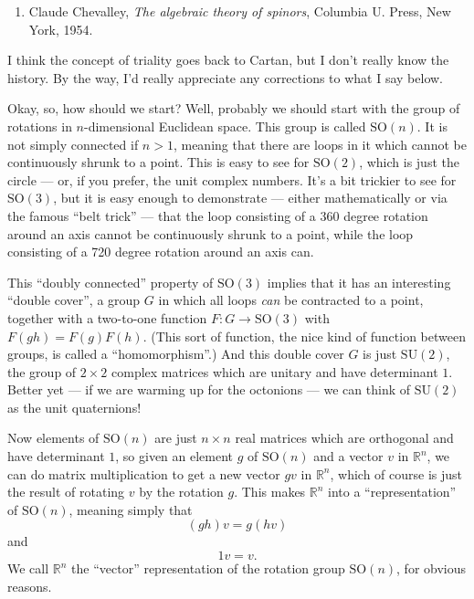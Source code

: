 \documentclass{article}
\def\tightlist{}
\begin{document}
\begin{enumerate}
\def\labelenumi{\arabic{enumi})}
\setcounter{enumi}{1}
\tightlist
\item
  Claude Chevalley, \emph{The algebraic theory of spinors}, Columbia U.
  Press, New York, 1954.
\end{enumerate}

I think the concept of triality goes back to Cartan, but I don't really
know the history. By the way, I'd really appreciate any corrections to
what I say below.

Okay, so, how should we start? Well, probably we should start with the
group of rotations in \(n\)-dimensional Euclidean space. This group is
called \(\mathrm{SO}(n)\). It is not simply connected if \(n > 1\),
meaning that there are loops in it which cannot be continuously shrunk
to a point. This is easy to see for \(\mathrm{SO}(2)\), which is just
the circle --- or, if you prefer, the unit complex numbers. It's a bit
trickier to see for \(\mathrm{SO}(3)\), but it is easy enough to
demonstrate --- either mathematically or via the famous ``belt trick''
--- that the loop consisting of a 360 degree rotation around an axis
cannot be continuously shrunk to a point, while the loop consisting of a
720 degree rotation around an axis can.

This ``doubly connected'' property of \(\mathrm{SO}(3)\) implies that it
has an interesting ``double cover'', a group \(G\) in which all loops
\emph{can} be contracted to a point, together with a two-to-one function
\(F\colon G \to \mathrm{SO}(3)\) with \(F(gh) = F(g)F(h)\). (This sort
of function, the nice kind of function between groups, is called a
``homomorphism''.) And this double cover \(G\) is just
\(\mathrm{SU}(2)\), the group of \(2\times2\) complex matrices which are
unitary and have determinant \(1\). Better yet --- if we are warming up
for the octonions --- we can think of \(\mathrm{SU}(2)\) as the unit
quaternions!

Now elements of \(\mathrm{SO}(n)\) are just \(n\times n\) real matrices
which are orthogonal and have determinant \(1\), so given an element
\(g\) of \(\mathrm{SO}(n)\) and a vector \(v\) in \(\mathbb{R}^n\), we
can do matrix multiplication to get a new vector \(gv\) in
\(\mathbb{R}^n\), which of course is just the result of rotating \(v\)
by the rotation \(g\). This makes \(\mathbb{R}^n\) into a
``representation'' of \(\mathrm{SO}(n)\), meaning simply that
\[(gh)v = g(hv)\] and \[1v = v.\] We call \(\mathbb{R}^n\) the
``vector'' representation of the rotation group \(\mathrm{SO}(n)\), for
obvious reasons.
\end{document}

